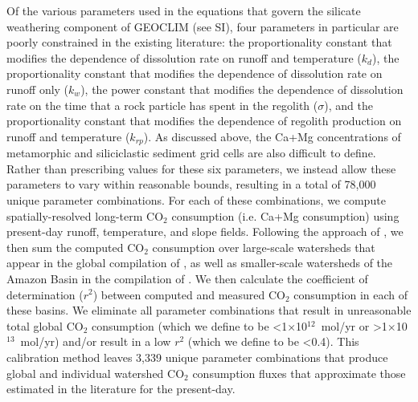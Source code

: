 \documentclass[11pt,letterpaper]{article}
\newcommand{\COtwo}{CO$_{2}$\xspace}
\begin{document}
Of the various parameters used in the equations that govern the silicate weathering component of GEOCLIM (see SI), four parameters in particular are poorly constrained in the existing literature: the proportionality constant that modifies the dependence of dissolution rate on runoff and temperature ($k_{d}$), the proportionality constant that modifies the dependence of dissolution rate on runoff only ($k_{w}$), the power constant that modifies the dependence of dissolution rate on the time that a rock particle has spent in the regolith ($\sigma$), and the proportionality constant that modifies the dependence of regolith production on runoff and temperature ($k_{rp}$). As discussed above, the Ca+Mg concentrations of metamorphic and siliciclastic sediment grid cells are also difficult to define. Rather than prescribing values for these six parameters, we instead allow these parameters to vary within reasonable bounds, resulting in a total of 78,000 unique parameter combinations. For each of these combinations, we compute spatially-resolved long-term \COtwo consumption (i.e. Ca+Mg consumption) using present-day runoff, temperature, and slope fields. Following the approach of \citet{Maffre2018a}, we then sum the computed \COtwo consumption over large-scale watersheds that appear in the global compilation of \citet{Gaillardet1999a}, as well as smaller-scale watersheds of the Amazon Basin in the compilation of \citet{Moquet2011a, Moquet2016a, Moquet2018a}. We then calculate the coefficient of determination ($r^{2}$) between computed and measured \COtwo consumption in each of these basins. We eliminate all parameter combinations that result in unreasonable total global \COtwo consumption (which we define to be \textless1$\times$10$^{12}$~mol/yr or \textgreater1$\times$10$^{13}$~mol/yr) and/or result in a low $r^{2}$ (which we define to be \textless0.4). This calibration method leaves 3,339 unique parameter combinations that produce global and individual watershed \COtwo consumption fluxes that approximate those estimated in the literature for the present-day.
\end{document}
